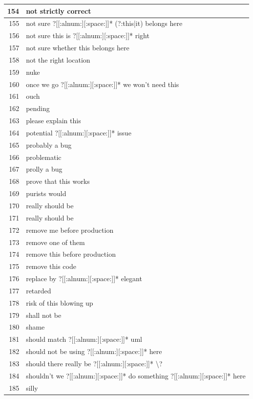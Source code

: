 \documentclass[
]{article}
\begin{document}
\begin{longtable}{r|l}
\hline
154 & not strictly correct\\
\hline
155 & not sure ?[[:alnum:][:space:]]* (?:this|it) belongs here\\
\hline
156 & not sure this is ?[[:alnum:][:space:]]* right\\
\hline
157 & not sure whether this belongs here\\
\hline
158 & not the right location\\
\hline
159 & nuke\\
\hline
160 & once we go ?[[:alnum:][:space:]]* we won't need this\\
\hline
161 & ouch\\
\hline
162 & pending\\
\hline
163 & please explain this\\
\hline
164 & potential ?[[:alnum:][:space:]]* issue\\
\hline
165 & probably a bug\\
\hline
166 & problematic\\
\hline
167 & prolly a bug\\
\hline
168 & prove that this works\\
\hline
169 & purists would\\
\hline
170 & really should be\\
\hline
171 & really should be\\
\hline
172 & remove me before production\\
\hline
173 & remove one of them\\
\hline
174 & remove this before production\\
\hline
175 & remove this code\\
\hline
176 & replace by ?[[:alnum:][:space:]]* elegant\\
\hline
177 & retarded\\
\hline
178 & risk of this blowing up\\
\hline
179 & shall not be\\
\hline
180 & shame\\
\hline
181 & should match ?[[:alnum:][:space:]]* uml\\
\hline
182 & should not be using ?[[:alnum:][:space:]]* here\\
\hline
183 & should there really be ?[[:alnum:][:space:]]* \textbackslash{}?\\
\hline
184 & shouldn't we ?[[:alnum:][:space:]]* do something ?[[:alnum:][:space:]]* here\\
\hline
185 & silly\\

\end{longtable}
\end{document}
